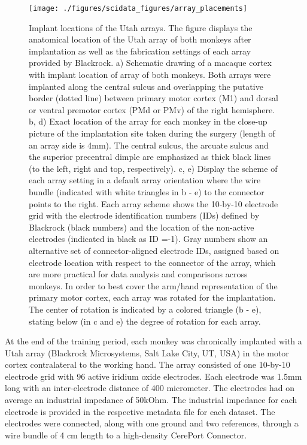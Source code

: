 {\begin{figure}
\texttt{[image: ./figures/scidata\_figures/array\_placements]}
\caption[Implant locations of the Utah arrays]{Implant locations of the Utah arrays. The figure displays the anatomical location of the Utah array of both monkeys after implantation as well as the fabrication settings of each array provided by Blackrock. a) Schematic drawing of a macaque cortex with implant location of array of both monkeys. Both arrays were implanted along the central sulcus and overlapping the putative border (dotted line) between primary motor cortex (M1) and dorsal or ventral premotor cortex (PMd or PMv) of the right hemisphere. b, d) Exact location of the array for each monkey in the close-up picture of the implantation site taken during the surgery (length of an array side is 4mm). The central sulcus, the arcuate sulcus and the superior precentral dimple are emphasized as thick black lines (to the left, right and top, respectively). c, e) Display the scheme of each array setting in a default array orientation where the wire bundle (indicated with white triangles in b - e) to the connector points to the right. Each array scheme shows the 10-by-10 electrode grid with the electrode identification numbers (IDs) defined by Blackrock (black numbers) and the location of the non-active electrodes (indicated in black as ID =-1). Gray numbers show an alternative set of connector-aligned electrode IDs, assigned based on electrode location with respect to the connector of the array, which are more practical for data analysis and comparisons across monkeys. In order to best cover the arm/hand representation of the primary motor cortex, each array was rotated for the implantation. The center of rotation is indicated by a colored triangle (b - e), stating below (in c and e) the degree of rotation for each array.}
\label{fig:implant_locations}
\end{figure}


At the end of the training period, each monkey was chronically implanted with a Utah array (Blackrock Microsystems, Salt Lake City, UT, USA) in the motor cortex contralateral to the working hand. The array consisted of one 10-by-10 electrode grid with 96 active iridium oxide electrodes. Each electrode was 1.5mm long with an inter-electrode distance of 400 micrometer. The electrodes had on average an industrial impedance of 50kOhm. The industrial impedance for each electrode is provided in the respective metadata file for each dataset. The electrodes were connected, along with one ground and two references, through a wire bundle of 4 cm length to a high-density CerePort Connector. 

}
